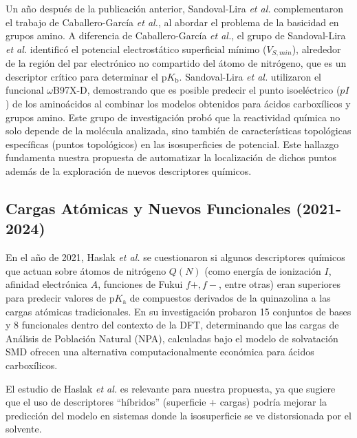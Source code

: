 \documentclass[12pt]{article}
\begin{document}
	Un año despu\'{e}s de la publicaci\'{o}n anterior, Sandoval-Lira \textit{et al.} \cite{bib:sandovallira2020} complementaron el trabajo de 
	Caballero-Garc\'{i}a \textit{et al.}, al abordar el problema de la basicidad en grupos amino. A diferencia de Caballero-Garc\'{i}a \textit{et al.},
	el grupo de Sandoval-Lira \textit{et al.} identific\'{o} el potencial electrost\'{a}tico superficial m\'{i}nimo ($V_{S,min}$), alrededor de la regi\'{o}n del par 
	electr\'{o}nico no compartido del \'{a}tomo de nitr\'{o}geno, que es un descriptor cr\'{i}tico para determinar el $\mathrm{p}K_{\mathrm{b}}$. 
	Sandoval-Lira \textit{et al.} utilizaron el funcional $\omega$B97X-D, demostrando que es posible predecir 
	el punto isoel\'{e}ctrico ($pI$) de los amino\'{a}cidos al combinar los modelos obtenidos para \'{a}cidos carbox\'{i}licos y grupos amino. 
	Este grupo de investigaci\'{o}n prob\'{o} que la reactividad qu\'{i}mica no solo depende de la mol\'{e}cula analizada, sino también de caracter\'{i}sticas
	 topol\'{o}gicas espec\'{i}ficas (puntos topol\'{o}gicos) en las isosuperficies de potencial. Este hallazgo fundamenta nuestra propuesta de 
	 automatizar la localizaci\'{o}n de dichos puntos adem\'{a}s de la exploraci\'{o}n de nuevos descriptores qu\'{i}micos.
	
	
	
	
	\subsection{Cargas At\'{o}micas y Nuevos Funcionales (2021-2024)}
	
	En el año de 2021, Haslak \textit{et al.} \cite{Haslak2021} se cuestionaron si algunos descriptores qu\'{i}micos que actuan sobre \'{a}tomos de nitr\'{o}geno $Q(N)$ (como energ\'{i}a de ionizaci\'{o}n $I$, afinidad electr\'{o}nica $A$, funciones de Fukui $f+, f-$, entre otras) eran superiores para predecir valores de $\mathrm{p}K_{\mathrm{a}}$ de compuestos derivados de la quinazolina a las cargas at\'{o}micas tradicionales. En su investigaci\'{o}n  probaron 15 conjuntos de bases y 8 funcionales dentro del contexto de la DFT, determinando que las cargas de An\'{a}lisis de Poblaci\'{o}n Natural (NPA), calculadas bajo el modelo de solvataci\'{o}n SMD ofrecen una alternativa computacionalmente econ\'{o}mica para \'{a}cidos carbox\'{i}licos. 
	
	
	El estudio de Haslak \textit{et al.} es relevante para nuestra propuesta, ya que sugiere que el uso de descriptores ``h\'{i}bridos'' (superficie + cargas) podr\'{i}a mejorar la predicci\'{o}n del modelo en sistemas donde la isosuperficie se ve distorsionada por el solvente.
	
\end{document}
